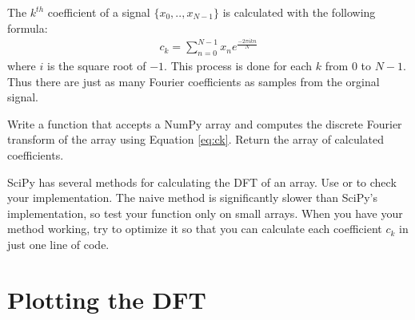The $k^{th}$ coefficient of a signal $\{x_0, .., x_{N-1}\}$ is calculated with the following formula:
\begin{align}
c_k = \displaystyle{\sum_{n=0}^{N-1}} x_n e^{\frac{-2\pi ikn}{N}}\label{eq:ck}
\end{align}
where $i$ is the square root of $-1$.
This process is done for each $k$ from $0$ to $N-1$.
Thus there are just as many Fourier coefficients as samples from the orginal signal.

\begin{problem} %
Write a function that accepts a NumPy array and computes the discrete Fourier transform of the array using Equation \ref{eq:ck}.
Return the array of calculated coefficients.

SciPy has several methods for calculating the DFT of an array.
Use  or  to check your implementation.
The naive method is significantly slower than SciPy's implementation, so test your function only on small arrays.
When you have your method working, try to optimize it so that you can calculate each coefficient $c_k$ in just one line of code.
\end{problem}

\section*{Plotting the DFT} %

